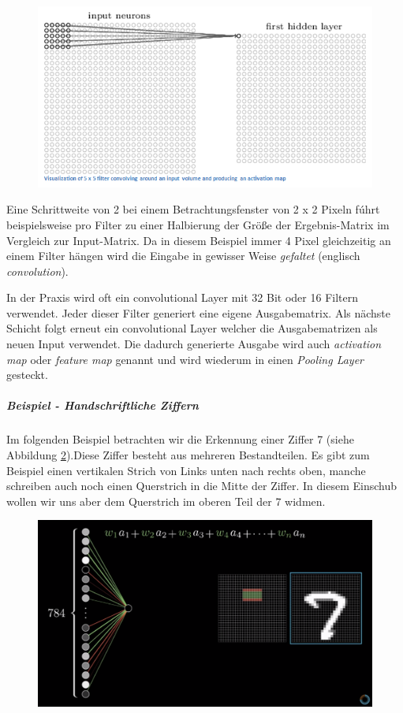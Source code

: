 \begin{figure}[!htb]
	\centering
	\includegraphics[width=.6\linewidth]{img/cnn_convLayer}
	\label{fig:cnn_convLayer}
\end{figure}

Eine Schrittweite von 2 bei einem Betrachtungsfenster von 2 x 2 Pixeln fúhrt beispielsweise pro Filter zu einer Halbierung der Größe der Ergebnis-Matrix im Vergleich zur Input-Matrix. Da in diesem Beispiel immer 4 Pixel gleichzeitig an einem Filter hängen wird die Eingabe in gewisser Weise \emph{gefaltet} (englisch \emph{convolution}). 

In der Praxis wird oft ein convolutional Layer mit 32 Bit oder 16 Filtern verwendet. Jeder dieser Filter generiert eine eigene Ausgabematrix. Als nächste Schicht folgt erneut ein convolutional Layer welcher die Ausgabematrizen als neuen Input verwendet. Die dadurch generierte Ausgabe wird auch \emph{activation map} oder \emph{feature map} genannt und wird wiederum in einen \emph{Pooling Layer} gesteckt. 

\subparagraph{Beispiel - Handschriftliche Ziffern}
Im folgenden Beispiel betrachten wir die Erkennung einer Ziffer 7 (siehe Abbildung \ref{fig:cnn_filter}).Diese Ziffer besteht aus mehreren Bestandteilen. Es gibt zum Beispiel einen vertikalen Strich von Links unten nach rechts oben, manche schreiben auch noch einen Querstrich in die Mitte der Ziffer. In diesem Einschub wollen wir uns aber dem Querstrich im oberen Teil der 7 widmen. 

\begin{figure}[!htb]
	\centering
	\includegraphics[width=.7\linewidth]{img/filter}
	\label{fig:cnn_filter}
\end{figure}


